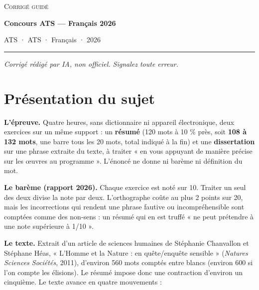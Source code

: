 \documentclass[11pt,a4paper]{article}
\begin{document}
\thispagestyle{plain}
\begin{center}
  {\small\scshape Corrigé guidé}\par\smallskip
  {\LARGE\bfseries Concours ATS — Français 2026\par}\medskip
  {\large ATS · ATS · Français · 2026\par}
\end{center}
\vspace{2pt}\hrule\vspace{8pt}

\emph{Corrigé rédigé par IA, non officiel. Signalez toute erreur.}

\hypertarget{pruxe9sentation-du-sujet}{%
\section{Présentation du sujet}\label{pruxe9sentation-du-sujet}}

\textbf{L'épreuve.} Quatre heures, sans dictionnaire ni appareil électronique, deux exercices sur un même support : un \textbf{résumé} (120 mots à 10 \% près, soit \textbf{108 à 132 mots}, une barre tous les 20 mots, total indiqué à la fin) et une \textbf{dissertation} sur une phrase extraite du texte, à traiter « en vous appuyant de manière précise sur les œuvres au programme ». L'énoncé ne donne ni barème ni définition du mot.

\textbf{Le barème (rapport 2026).} Chaque exercice est noté sur 10. Traiter un seul des deux divise la note par deux. L'orthographe coûte au plus 2 points sur 20, mais les incorrections qui rendent une phrase fautive ou incompréhensible sont comptées comme des non-sens : un résumé qui en est truffé « ne peut prétendre à une note supérieure à 1/10 ».

\textbf{Le texte.} Extrait d'un article de sciences humaines de Stéphanie Chanvallon et Stéphane Héas, « L'Homme et la Nature : en quête/enquête sensible » (\emph{Natures Sciences Sociétés}, 2011), d'environ 560 mots comptés entre blancs (environ 600 si l'on compte les élisions). Le résumé impose donc une contraction d'environ un cinquième. Le texte avance en quatre mouvements :
\end{document}
